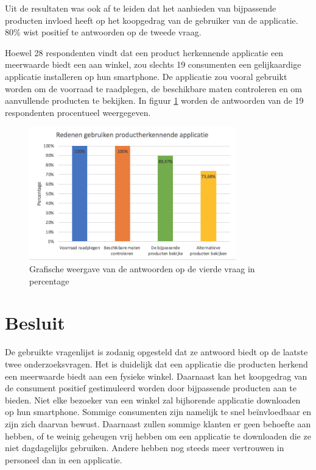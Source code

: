 Uit de resultaten was ook af te leiden dat het aanbieden van bijpassende producten invloed heeft op het koopgedrag van de gebruiker van de applicatie. 80\% wist positief te antwoorden op de tweede vraag. 

Hoewel 28 respondenten vindt dat een product herkennende applicatie een meerwaarde biedt een aan winkel, zou slechts 19 consumenten een gelijkaardige applicatie installeren op hun smartphone. De applicatie zou vooral gebruikt worden om de voorraad te raadplegen, de beschikbare maten controleren en om aanvullende producten te bekijken. In figuur \ref{fig:antwoordvraag} worden de antwoorden van de 19 respondenten procentueel weergegeven.

\begin{figure}[h!]
    \centering
        \includegraphics[width=0.8\textwidth]{img/antwoordenrespondenten.png}
    \caption{Grafische weergave van de antwoorden op de vierde vraag in percentage}
    \label{fig:antwoordvraag}
  \end{figure}

\section{Besluit}
\label{sec:Besluit}

De gebruikte vragenlijst is zodanig opgesteld dat ze antwoord biedt op de laatste twee onderzoeksvragen. Het is duidelijk dat een applicatie die producten herkend een meerwaarde biedt aan een fysieke winkel. Daarnaast kan het koopgedrag van de consument positief gestimuleerd worden door bijpassende producten aan te bieden. Niet elke bezoeker van een winkel zal bijhorende applicatie downloaden op hun smartphone. Sommige consumenten zijn namelijk te snel beïnvloedbaar en zijn zich daarvan bewust. Daarnaast zullen sommige klanten er geen behoefte aan hebben, of te weinig geheugen vrij hebben om een applicatie te downloaden die ze niet dagdagelijks gebruiken. Andere hebben nog steeds meer vertrouwen in personeel dan in een applicatie. 

